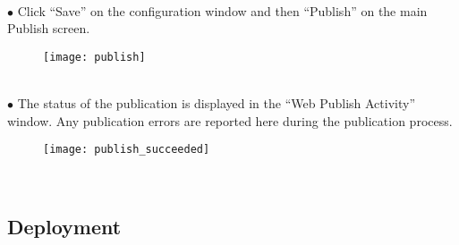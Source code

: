     \ \\
    $\bullet$ Click ``Save'' on the configuration window and then ``Publish'' on the main Publish screen.
    \begin{figure}[H] 
        \centering
        \texttt{[image: publish]}
    \end{figure}
    
    \ \\
    $\bullet$ The status of the publication is displayed in the ``Web Publish Activity'' window.  Any publication errors are reported here during the publication process.
    \begin{figure}[H] 
        \centering
        \texttt{[image: publish\_succeeded]}
    \end{figure}
    \ \\
\subsection{Deployment}